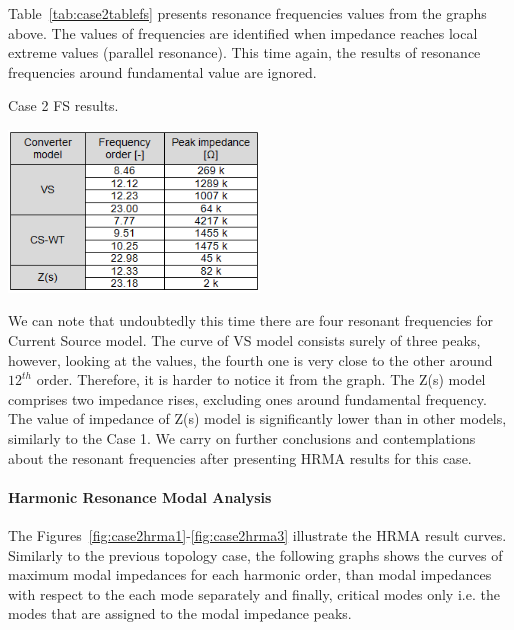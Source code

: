 \documentclass[12pt]{report} %
\begin{document}
Table~\ref{tab:case2tablefs} presents resonance frequencies values from the graphs above. The values of frequencies are identified when impedance reaches local extreme values (parallel resonance). This time again, the results of resonance frequencies around fundamental value are ignored.

\begin{table}[htb]
	\centering
	\caption{Case 2 FS results.}
	\label{tab:case2tablefs}
	\includegraphics[width=0.5\textwidth]{img/Case2/table_FS.png}
\end{table}
\FloatBarrier

We can note that undoubtedly this time there are four resonant frequencies for Current Source model. The curve of VS model consists surely of three peaks, however, looking at the values, the fourth one is very close to the other around $12^{th}$ order. Therefore, it is harder to notice it from the graph. The Z(s) model comprises two impedance rises, excluding ones around fundamental frequency. The value of impedance of Z(s) model is significantly lower than in other models, similarly to the Case 1. We carry on further conclusions and contemplations about the resonant frequencies after presenting HRMA results for this case.

\paragraph{Harmonic Resonance Modal Analysis}
The Figures~\ref{fig:case2hrma1}-\ref{fig:case2hrma3} illustrate the HRMA result curves. Similarly to the previous topology case, the following graphs shows the curves of maximum modal impedances for each harmonic order, than modal impedances with respect to the each mode separately and finally, critical modes only i.e. the modes that are assigned to the modal impedance peaks.
\end{document}
